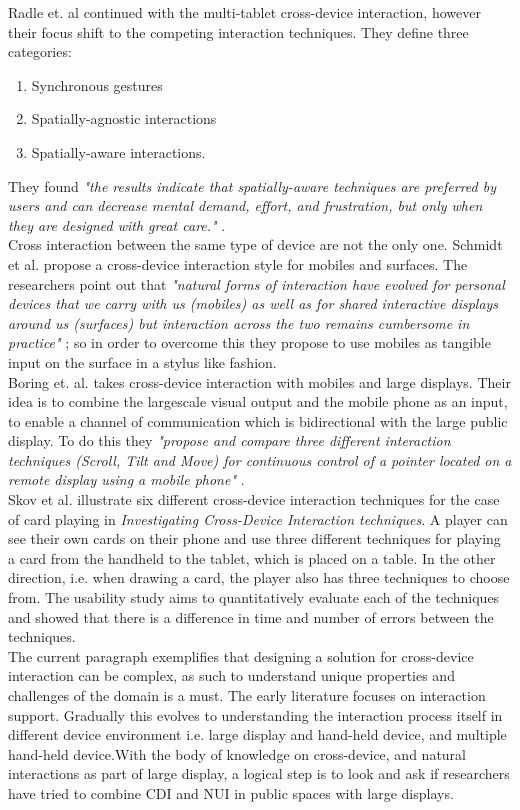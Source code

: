 Radle et. al continued with the multi-tablet cross-device interaction, however their focus shift to the competing interaction techniques. They define three categories: \begin{enumerate}
	\item Synchronous gestures
	\item Spatially-agnostic interactions
	\item Spatially-aware interactions. 
\end{enumerate} They found \emph{"the results indicate that spatially-aware techniques are preferred by users and can decrease mental demand, effort, and frustration, but only when they are designed with great care."} \cite{Radle:2015}.\\

Cross interaction between the same type of device are not the only one. Schmidt et al. propose a cross-device interaction style for mobiles and surfaces. The researchers point out that \emph{"natural forms of interaction have evolved for personal devices that we carry with us (mobiles) as well as for shared interactive displays around us (surfaces) but interaction across the two remains cumbersome in practice"} \cite{Schmidt:2012}; so in order to overcome this they propose to use mobiles as tangible input on the surface in a stylus like fashion.\\

Boring et. al. takes cross-device interaction with mobiles and large displays. Their idea is to combine the largescale visual output and the mobile phone as an input, to enable a channel of communication which is bidirectional with the large public display. To do this they \emph{"propose and compare three different interaction techniques (Scroll, Tilt and Move) for continuous control of a pointer located on a remote display using a mobile phone"} \cite{Boring:2009}.\\
Skov et al. \cite{Skov:2015} illustrate six different cross-device interaction techniques for the case of card playing in \emph{Investigating Cross-Device Interaction techniques}.
A player can see their own cards on their phone and use three different techniques for playing a card from the handheld to the tablet, which is placed on a table.
In the other direction, i.e. when drawing a card, the player also has three techniques to choose from.
The usability study aims to quantitatively evaluate each of the techniques and showed that there is a difference in time and number of errors between the techniques. \\

The current paragraph exemplifies that designing a solution for cross-device interaction can be complex, as such to understand  unique properties and challenges of the domain is a must. The early literature focuses on interaction support. Gradually this evolves to understanding the interaction process itself in different device environment i.e. large display and hand-held device, and multiple hand-held device.With the body of knowledge on cross-device, and natural interactions as part of large display, a logical step is to look and ask if researchers have tried to combine CDI and NUI in public spaces with large displays.
